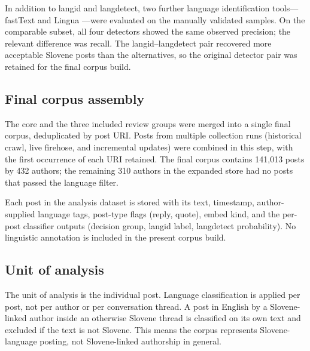 In addition to langid and langdetect, two further language identification tools---fastText \parencite{joulin2017bag} and Lingua \parencite{stahl2022lingua}---were evaluated on the manually validated samples. On the comparable subset, all four detectors showed the same observed precision; the relevant difference was recall. The langid--langdetect pair recovered more acceptable Slovene posts than the alternatives, so the original detector pair was retained for the final corpus build.

\subsection{Final corpus assembly}

The core and the three included review groups were merged into a single final corpus, deduplicated by post URI. Posts from multiple collection runs (historical crawl, live firehose, and incremental updates) were combined in this step, with the first occurrence of each URI retained. The final corpus contains 141,013 posts by 432 authors; the remaining 310 authors in the expanded store had no posts that passed the language filter.

Each post in the analysis dataset is stored with its text, timestamp, author-supplied language tags, post-type flags (reply, quote), embed kind, and the per-post classifier outputs (decision group, langid label, langdetect probability). No linguistic annotation is included in the present corpus build.

\subsection{Unit of analysis}

The unit of analysis is the individual post. Language classification is applied per post, not per author or per conversation thread. A post in English by a Slovene-linked author inside an otherwise Slovene thread is classified on its own text and excluded if the text is not Slovene. This means the corpus represents Slovene-language posting, not Slovene-linked authorship in general.
